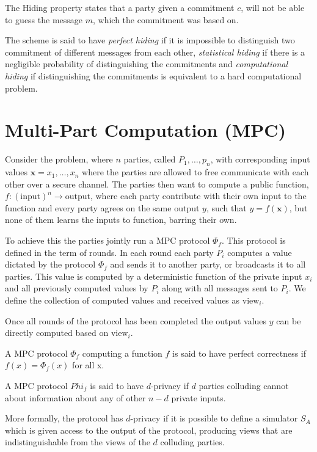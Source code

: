 \begin{definition}
The Hiding property states that a party given a commitment $c$, will not be able
to guess the message $m$, which the commitment was based on.

The scheme is said to have \textit{perfect hiding} if it is impossible to
distinguish two commitment of different messages from each other,
\textit{statistical hiding} if there is a negligible probability of
distinguishing the commitments and \textit{computational hiding} if
distinguishing the commitments is equivalent to a hard computational problem.
\end{definition}


\section{Multi-Part Computation (MPC)}
\label{sec:background:mpc}
Consider the problem, where $n$ parties, called $P_{1}, \dots, p_{n}$, with
corresponding input values $\textbf{x} = x_{1}, \dots, x_{n}$ where the parties
are allowed to free communicate with each other over a secure channel.
The parties then want to compute a public function,
$f : (\text{input})^{n} \rightarrow \text{output}$, where each party contribute
with their own input to the function and every party agrees on the same output
$y$, such that $y = f(\textbf{x})$, but none of them learns the inputs to
function, barring their own.

To achieve this the parties jointly run a MPC protocol $\Phi_{f}$. This protocol
is defined in the term of rounds. In each round each party $P_{i}$ computes a
value dictated  by the protocol $\Phi_{f}$ and sends it to another party, or
broadcasts it to all parties. This value is computed by a deterministic
function of the private input $x_{i}$ and all previously computed values by
$P_{i}$ along with all messages sent to $P_{i}$. We define the collection of
computed values and received values as $\text{view}_{i}$.

Once all rounds of the protocol has been completed the output values $y$ can be
directly computed based on $\text{view}_{i}$.


\begin{definition}
  \label{def:mpc:correctness}
  A MPC protocol $\Phi_{f}$ computing a function $f$ is said to have perfect
  correctness if $f(x) = \Phi_{f}(x)$ for all x.
\end{definition}

\begin{definition}[d-Privacy]
\label{def:mpc:d-privacy}
  A MPC protocol $Phi_{f}$ is said to have $d$-privacy if $d$ parties colluding
  cannot about information about any of other $n-d$ private inputs.

  More formally, the protocol has $d$-privacy if it is possible to define a
  simulator $S_{A}$ which is given access to the output of the protocol,
  producing views that are indistinguishable from the views of the $d$ colluding
  parties.
\end{definition}

